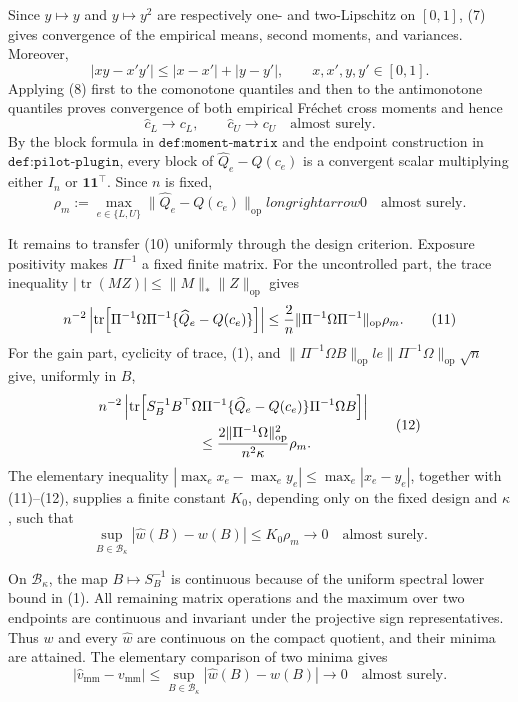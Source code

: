 Since \(y\mapsto y\) and \(y\mapsto y^2\) are respectively one- and two-Lipschitz on \([0,1]\), (7) gives convergence of the empirical means, second moments, and variances.  Moreover,
\[
|xy-x'y'|\le |x-x'|+|y-y'|,
\qquad x,x',y,y'\in[0,1].
\tag{8}
\]
Applying (8) first to the comonotone quantiles and then to the antimonotone quantiles proves convergence of both empirical Fr\'echet cross moments and hence
\[
\widehat c_L\to c_L,
\qquad
\widehat c_U\to c_U
\quad\text{almost surely}.
\tag{9}
\]
By the block formula in \(\texttt{def:moment-matrix}\) and the endpoint construction in \(\texttt{def:pilot-plugin}\), every block of \(\widehat Q_e-Q(c_e)\) is a convergent scalar multiplying either \(I_n\) or \(\mathbf 1\mathbf 1^{\top}\).  Since \(n\) is fixed,
\[
\rho_m:=\max_{e\in\{L,U\}}
\lVert\widehat Q_e-Q(c_e)\rVert_{\mathrm{op}}longrightarrow0
\quad\text{almost surely}.
\tag{10}
\]

It remains to transfer (10) uniformly through the design criterion.  Exposure positivity makes \(\Pi^{-1}\) a fixed finite matrix.  For the uncontrolled part, the trace inequality \(|\operatorname{tr}(MZ)|\le\lVert M\rVert_*\lVert Z\rVert_{\mathrm{op}}\) gives
\[
n^{-2}\left|
\operatorname{tr}\!\left[\Pi^{-1}\Omega\Pi^{-1}
\{\widehat Q_e-Q(c_e)\}\right]\right|
\le {2\over n}\lVert\Pi^{-1}\Omega\Pi^{-1}\rVert_{\mathrm{op}}\rho_m.
\tag{11}
\]
For the gain part, cyclicity of trace, (1), and
\(\lVert\Pi^{-1}\Omega B\rVert_{\mathrm{op}}le
\lVert\Pi^{-1}\Omega\rVert_{\mathrm{op}}\sqrt n\) give, uniformly in \(B\),
\[
\begin{split}
&n^{-2}\left|\operatorname{tr}\!\left[
S_B^{-1}B^{\top}\Omega\Pi^{-1}
\{\widehat Q_e-Q(c_e)\}
\Pi^{-1}\Omega B\right]\right|\\
&\hspace{25mm}\le
{2\lVert\Pi^{-1}\Omega\rVert_{\mathrm{op}}^2\over n^2\kappa}\rho_m.
\end{split}
\tag{12}
\]
The elementary inequality
\(\left|\max_e x_e-\max_e y_e\right|\le\max_e|x_e-y_e|\), together with (11)--(12), supplies a finite constant \(K_0\), depending only on the fixed design and \(\kappa\), such that
\[
\sup_{B\in\mathcal B_\kappa}|\widehat w(B)-w(B)|
\le K_0\rho_m\longrightarrow0
\quad\text{almost surely}.
\tag{13}
\]

On \(\mathcal B_\kappa\), the map \(B\mapsto S_B^{-1}\) is continuous because of the uniform spectral lower bound in (1).  All remaining matrix operations and the maximum over two endpoints are continuous and invariant under the projective sign representatives.  Thus \(w\) and every \(\widehat w\) are continuous on the compact quotient, and their minima are attained.  The elementary comparison of two minima gives
\[
|\widehat v_{\mathrm{mm}}-v_{\mathrm{mm}}|
\le\sup_{B\in\mathcal B_\kappa}|\widehat w(B)-w(B)|
\longrightarrow0
\quad\text{almost surely}.
\tag{14}
\]

